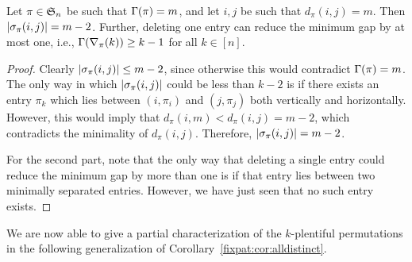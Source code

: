   \begin{lemma} \label{fixpat:lem:span}
    Let $\pi \in \S_n$ be such that $\Gam(\pi) = m$, and let $i,j$ be such that
    $d_\pi(i,j) = m$. Then $|\pspan_\pi(i,j)| = m-2$. Further, deleting one
    entry can reduce the minimum gap by at most one, i.e., $\Gam(\delpi(k))
    \geq k-1$ for all $k \in [n]$. 
  \end{lemma}
  \begin{proof}
    Clearly $|\pspan_\pi(i,j)| \leq m-2$, since otherwise this would contradict
    $\Gam(\pi) = m$. The only way in which $|\pspan_\pi(i,j)|$ could be less
    than $k-2$ is if there exists an entry $\pi_k$ which lies between
    $(i,\pi_i)$ and $(j,\pi_j)$ both vertically and horizontally. However, this
    would imply that $d_\pi(i,m) < d_\pi(i,j) = m-2$, which contradicts the
    minimality of $d_\pi(i,j)$. Therefore, $|\pspan_\pi(i,j)| = m-2$. 

    For the second part, note that the only way that deleting a single entry
    could reduce the minimum gap by more than one is if that entry lies between
    two minimally separated entries. However, we have just seen that no such
    entry exists. 
  \end{proof}

  We are now able to give a partial characterization of the $k$-plentiful
  permutations in the following generalization of
  Corollary~\ref{fixpat:cor:alldistinct}. 

